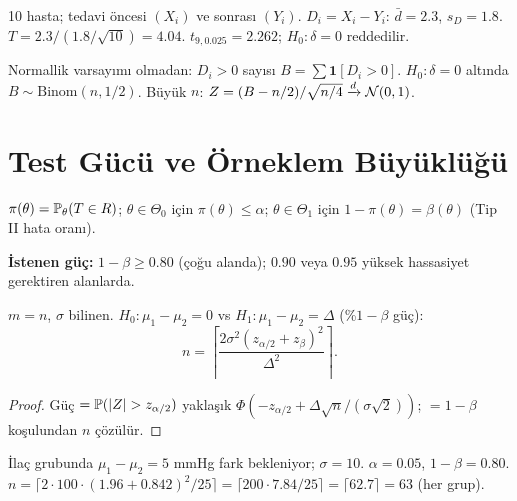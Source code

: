 \begin{ornek}\label{ex:eslestirme_ornek}
10 hasta; tedavi öncesi $(X_i)$ ve sonrası $(Y_i)$. $D_i = X_i-Y_i$: $\bar d=2.3$, $s_D=1.8$. $T=2.3/(1.8/\sqrt{10})=4.04$. $t_{9,0.025}=2.262$; $H_0:\delta=0$ reddedilir.
\end{ornek}

\begin{teorem}\label{thm:isaret_testi}
Normallik varsayımı olmadan: $D_i>0$ sayısı $B=\sum\mathbf{1}[D_i>0]$. $H_0:\delta=0$ altında $B\sim\mathrm{Binom}(n,1/2)$. Büyük $n$: $Z=(B-n/2)/\sqrt{n/4}\xrightarrow{d}\mathcal{N}(0,1)$.
\end{teorem}

\section{Test Gücü ve Örneklem Büyüklüğü}
\label{sec:guc_hesap}

\begin{tanim}\label{def:guc_fonksiyon}
$\pi(\theta)=\mathbb{P}_\theta(T\in R)$; $\theta\in\Theta_0$ için $\pi(\theta)\leq\alpha$; $\theta\in\Theta_1$ için $1-\pi(\theta)=\beta(\theta)$ (Tip II hata oranı).

\textbf{İstenen güç:} $1-\beta\geq0.80$ (çoğu alanda); $0.90$ veya $0.95$ yüksek hassasiyet gerektiren alanlarda.
\end{tanim}

\begin{teorem}\label{thm:iki_orneklem_n}
$m=n$, $\sigma$ bilinen. $H_0:\mu_1-\mu_2=0$ vs $H_1:\mu_1-\mu_2=\Delta$ (\%$1-\beta$ güç):
\[
  n = \left\lceil\frac{2\sigma^2(z_{\alpha/2}+z_\beta)^2}{\Delta^2}\right\rceil.
\]
\end{teorem}

\begin{proof}
Güç $=\Prob(|Z|>z_{\alpha/2})$ yaklaşık $\Phi(-z_{\alpha/2}+\Delta\sqrt{n}/({\sigma\sqrt{2}}))$; $=1-\beta$ koşulundan $n$ çözülür.
\end{proof}

\begin{ornek}\label{ex:klinik_n}
İlaç grubunda $\mu_1-\mu_2=5$ mmHg fark bekleniyor; $\sigma=10$. $\alpha=0.05$, $1-\beta=0.80$. $n=\lceil 2\cdot100\cdot(1.96+0.842)^2/25\rceil=\lceil 200\cdot7.84/25\rceil=\lceil62.7\rceil=63$ (her grup).
\end{ornek}

